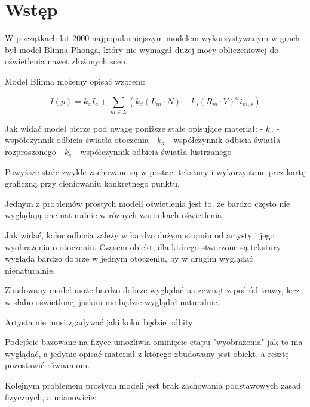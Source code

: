 \documentclass[../main.tex]{subfiles}
\begin{document}
\chapter*{Wstęp}

W początkach lat 2000 najpopularniejszym modelem wykorzystywanym w grach był
model Blinna-Phonga, który nie wymagał dużej mocy obliczeniowej do oświetlenia
nawet złożonych scen.

Model Blinna możemy opisać wzorem:

$$
I(p) = k_a I_a + \sum_{m \in L} \left( {
    k_d (L_m \cdot N) +
    k_s (R_m \cdot V)^{\alpha} i_{m,s}
} \right)
$$

Jak widać model bierze pod uwagę poniższe stałe opisujące materiał:
- $k_a$ - współczynnik odbicia światła otoczenia
- $k_d$ - współczynnik odbicia światła rozproszonego
- $k_s$ - współczynnik odbicia światła lustrzanego

Powyższe stałe zwykle zachowane są w postaci tekstury i wykorzystane prez kartę
graficzną przy cieniowaniu konkretnego punktu.


Jednym z problemów prostych modeli oświetlenia jest to, że bardzo często nie
wyglądają one naturalnie w różnych warunkach oświetlenia.

Jak widać, kolor odbicia zależy w bardzo dużym stopniu od artysty i jego
wyobrażenia o otoczeniu. Czasem obiekt, dla którego stworzone są tekstury
wygląda bardzo dobrze w jednym otoczeniu, by w drugim wyglądać nienaturalnie.

Zbudowany model może bardzo dobrze wyglądać na zewnątrz pośród trawy, lecz
w słabo oświetlonej jaskini nie  będzie wyglądał naturalnie.

Artysta nie musi zgadywać jaki kolor będzie odbity

Podejście bazowane na fizyce umożliwia ominięcie etapu "wyobrażenia" jak to ma
wyglądać, a jedynie opisać materiał z którego zbudowany jest obiekt, a resztę
pozostawić równaniom.


Kolejnym problemem prostych modeli jest brak zachowania podstawowych zasad
fizycznych, a mianowicie:
\end{document}
